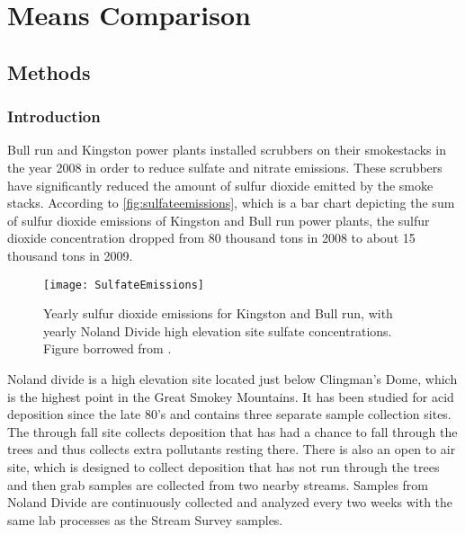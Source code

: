 \chapter{Means Comparison}\label{ch:mc}
\section{Methods}
\subsection{Introduction}

Bull run and Kingston power plants installed scrubbers on their smokestacks in the year 2008 in order to reduce sulfate and nitrate emissions.
These scrubbers have significantly reduced the amount of sulfur dioxide emitted by the smoke stacks.
According to \autoref{fig:sulfateemissions}, which is a bar chart depicting the sum of sulfur dioxide emissions of Kingston and Bull run power plants,  the sulfur dioxide concentration dropped from 80 thousand tons in 2008 to about 15 thousand tons in 2009.

\begin{figure}[h!]
  \centering
  \texttt{[image: SulfateEmissions]}\\
	\caption{Yearly sulfur dioxide emissions for Kingston and Bull run, with yearly Noland Divide high elevation site sulfate concentrations. Figure borrowed from \citet{cai2013}.}
  \label{fig:sulfateemissions}
\end{figure}

Noland divide is a high elevation site located just below Clingman's Dome, which is the highest point in the Great Smokey Mountains.  
It has been studied for acid deposition since the late 80's and contains three separate sample collection sites.
The through fall site collects deposition that has had a chance to fall through the trees and thus collects extra pollutants resting there.
There is also an open to air site, which is designed to collect deposition that has not run through the trees and then grab samples are collected from two nearby streams.
Samples from Noland Divide are continuously collected and analyzed every two weeks with the same lab processes as the Stream Survey samples.

